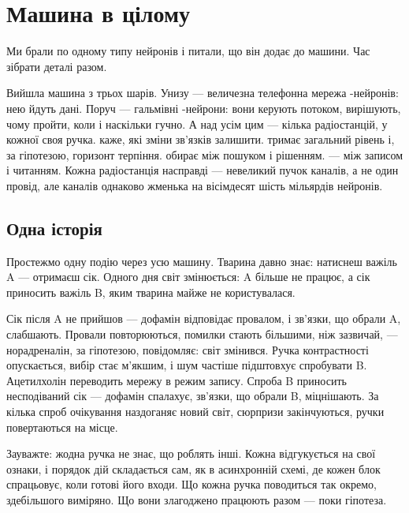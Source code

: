 \chapter{Машина в цілому}


Ми брали по одному типу нейронів і питали, що він додає до машини. Час зібрати деталі разом.

Вийшла машина з трьох шарів. Унизу --- величезна телефонна мережа -нейронів: нею йдуть дані. Поруч --- гальмівні -нейрони: вони керують потоком, вирішують, чому пройти, коли і наскільки гучно. А над усім цим --- кілька радіостанцій, у кожної своя ручка.  каже, які зміни зв'язків залишити.  тримає загальний рівень і, за гіпотезою, горизонт терпіння.  обирає між пошуком і рішенням.  --- між записом і читанням. Кожна радіостанція насправді --- невеликий пучок каналів, а не один провід, але каналів однаково жменька на вісімдесят шість мільярдів нейронів.

\section*{Одна історія}

Простежмо одну подію через усю машину. Тварина давно знає: натиснеш важіль A --- отримаєш сік. Одного дня світ змінюється: A більше не працює, а сік приносить важіль B, яким тварина майже не користувалася.

Сік після A не прийшов --- дофамін відповідає провалом, і зв'язки, що обрали A, слабшають. Провали повторюються, помилки стають більшими, ніж зазвичай, --- норадреналін, за гіпотезою, повідомляє: світ змінився. Ручка контрастності опускається, вибір стає м'якшим, і шум частіше підштовхує спробувати B. Ацетилхолін переводить мережу в режим запису. Спроба B приносить несподіваний сік --- дофамін спалахує, зв'язки, що обрали B, міцнішають. За кілька спроб очікування наздоганяє новий світ, сюрпризи закінчуються, ручки повертаються на місце.

Зауважте: жодна ручка не знає, що роблять інші. Кожна відгукується на свої ознаки, і порядок дій складається сам, як в асинхронній схемі, де кожен блок спрацьовує, коли готові його входи. Що кожна ручка поводиться так окремо, здебільшого виміряно. Що вони злагоджено працюють разом --- поки гіпотеза.

